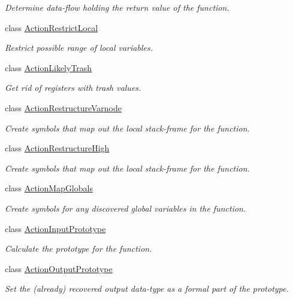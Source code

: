 \begin{DoxyCompactItemize}
\begin{DoxyCompactList}\small\item\em Determine data-\/flow holding the {\itshape return} {\itshape value} of the function. \end{DoxyCompactList}\item 
class \mbox{\hyperlink{class_action_restrict_local}{Action\+Restrict\+Local}}
\begin{DoxyCompactList}\small\item\em Restrict possible range of local variables. \end{DoxyCompactList}\item 
class \mbox{\hyperlink{class_action_likely_trash}{Action\+Likely\+Trash}}
\begin{DoxyCompactList}\small\item\em Get rid of registers with trash values. \end{DoxyCompactList}\item 
class \mbox{\hyperlink{class_action_restructure_varnode}{Action\+Restructure\+Varnode}}
\begin{DoxyCompactList}\small\item\em Create symbols that map out the local stack-\/frame for the function. \end{DoxyCompactList}\item 
class \mbox{\hyperlink{class_action_restructure_high}{Action\+Restructure\+High}}
\begin{DoxyCompactList}\small\item\em Create symbols that map out the local stack-\/frame for the function. \end{DoxyCompactList}\item 
class \mbox{\hyperlink{class_action_map_globals}{Action\+Map\+Globals}}
\begin{DoxyCompactList}\small\item\em Create symbols for any discovered global variables in the function. \end{DoxyCompactList}\item 
class \mbox{\hyperlink{class_action_input_prototype}{Action\+Input\+Prototype}}
\begin{DoxyCompactList}\small\item\em Calculate the prototype for the function. \end{DoxyCompactList}\item 
class \mbox{\hyperlink{class_action_output_prototype}{Action\+Output\+Prototype}}
\begin{DoxyCompactList}\small\item\em Set the (already) recovered output data-\/type as a formal part of the prototype. \end{DoxyCompactList}\item 

\end{DoxyCompactItemize}

